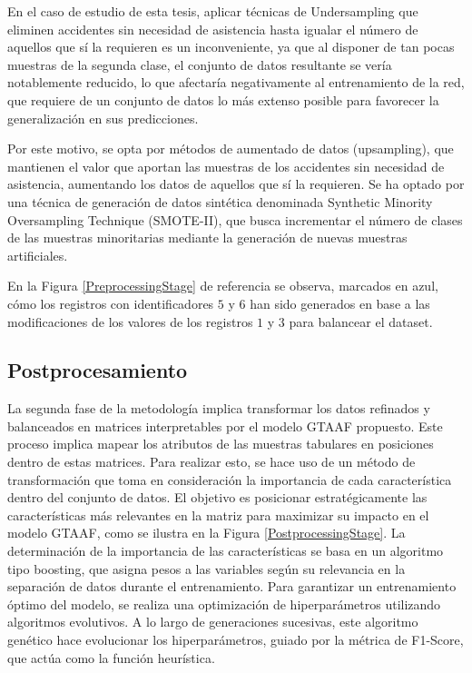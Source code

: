 \documentclass{uathesis-es}
\begin{document}
En el caso de estudio de esta tesis, aplicar técnicas de Undersampling que eliminen accidentes sin necesidad de asistencia hasta igualar el número de aquellos que sí la requieren es un inconveniente, ya que al disponer de tan pocas muestras de la segunda clase, el conjunto de datos resultante se vería notablemente reducido, lo que afectaría negativamente al entrenamiento de la red, que requiere de un conjunto de datos lo más extenso posible para favorecer la generalización en sus predicciones.

Por este motivo, se opta por métodos de aumentado de datos (upsampling), que mantienen el valor que aportan las muestras de los accidentes sin necesidad de asistencia, aumentando los datos de aquellos que sí la requieren. Se ha optado por una técnica de generación de datos sintética denominada Synthetic Minority Oversampling Technique (SMOTE-II), que busca incrementar el número de clases de las muestras minoritarias mediante la generación de nuevas muestras artificiales.

En la Figura \ref{PreprocessingStage} de referencia se observa, marcados en azul, cómo los registros con identificadores $5$ y $6$ han sido generados en base a las modificaciones de los valores de los registros $1$ y $3$ para balancear el dataset.



\subsection{Postprocesamiento}

La segunda fase de la metodología implica transformar los datos refinados y balanceados en matrices interpretables por el modelo GTAAF propuesto. Este proceso implica mapear los atributos de las muestras tabulares en posiciones dentro de estas matrices. Para realizar esto, se hace uso de un método de transformación que toma en consideración la importancia de cada característica dentro del conjunto de datos. El objetivo es posicionar estratégicamente las características más relevantes en la matriz para maximizar su impacto en el modelo GTAAF, como se ilustra en la Figura \ref{PostprocessingStage}. La determinación de la importancia de las características se basa en un algoritmo tipo boosting, que asigna pesos a las variables según su relevancia en la separación de datos durante el entrenamiento. Para garantizar un entrenamiento óptimo del modelo, se realiza una optimización de hiperparámetros utilizando algoritmos evolutivos. A lo largo de generaciones sucesivas, este algoritmo genético hace evolucionar los hiperparámetros, guiado por la métrica de F1-Score, que actúa como la función heurística.
\end{document}
